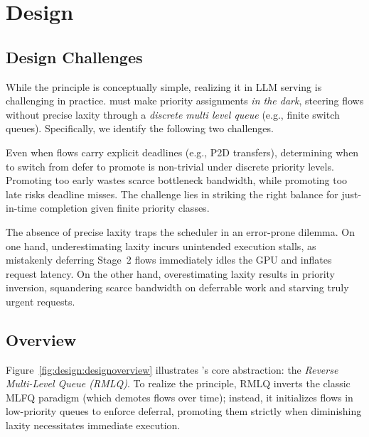 \section{Design}

\subsection{Design Challenges}

While the \DAP{} principle is conceptually simple, realizing it in LLM serving is challenging in practice. \sys{} must make priority assignments \emph{in the dark}, steering flows without precise laxity through a \emph{discrete multi level queue} (e.g., finite switch queues). Specifically, we identify the following two challenges.

Even when flows carry explicit deadlines (e.g., P2D transfers), determining when to switch from defer to promote is non-trivial under discrete priority levels. Promoting too early wastes scarce bottleneck bandwidth, while promoting too late risks deadline misses. The challenge lies in striking the right balance for just-in-time completion given finite priority classes.

The absence of precise laxity traps the scheduler in an error-prone dilemma. On one hand, underestimating laxity incurs unintended execution stalls, as mistakenly deferring Stage~2 flows immediately idles the GPU and inflates request latency. On the other hand, overestimating laxity results in priority inversion, squandering scarce bandwidth on deferrable work and starving truly urgent requests.



\subsection{Overview} Figure~\ref{fig:design:designoverview} illustrates \sys{}'s core abstraction: the \emph{Reverse Multi-Level Queue (RMLQ)}. To realize the \DAP{} principle, RMLQ inverts the classic MLFQ paradigm (which demotes flows over time); instead, it initializes flows in low-priority queues to enforce deferral, promoting them strictly when diminishing laxity necessitates immediate execution.

